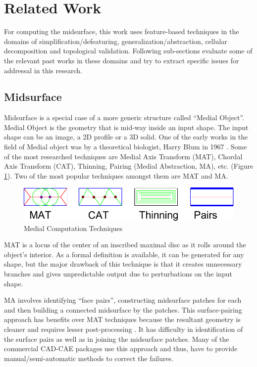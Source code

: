 
\section{Related Work}	

 For computing the midsurface, this work uses feature-based techniques in the domains of simplification/defeaturing, generalization/abstraction, cellular decomposition and topological validation. Following sub-sections evaluate some of the relevant past works in these domains and try to extract specific issues for addressal in this research.
 
 \subsection{Midsurface}
 
Midsurface is a special case of a more generic structure called ``Medial Object''. Medial Object is the geometry that is mid-way inside an input shape. The input shape can be an image, a 2D profile or a 3D solid. One of the early works in the field of Medial object was by a theoretical biologist, Harry Blum in 1967 \cite{Harry1967}. Some of the most researched techniques are  Medial Axis Transform (MAT), Chordal Axis Transform (CAT), Thinning, Pairing (Medial Abstraction, MA), etc. (Figure \ref{fig:medials}). Two of the most popular techniques amongst them  are MAT and MA. 

	\begin{figure} [!h]
		\centering
		\includegraphics[width=0.8\linewidth]{..//Common/images/MedialMethodsOnlyShort.pdf}
		\caption{Medial Computation Techniques}
		\label{fig:medials}
	\end{figure}



MAT is a locus of the center of an inscribed maximal disc as it rolls around the object's interior. As a formal definition is available, it can be generated for any shape, but the major drawback of this technique is that it creates unnecessary branches and gives unpredictable output due to perturbations on the input shape.

MA  involves identifying ``face pairs'', constructing midsurface patches for each and then building a connected midsurface by  the patches. This surface-pairing approach has benefits over MAT techniques because the resultant geometry is cleaner and requires lesser post-processing \cite{Lockett2008}. It has difficulty in identification of the surface pairs as well as in joining the midsurface patches. Many of the commercial CAD-CAE packages use this approach and thus, have to provide manual/semi-automatic methods to correct the failures.

